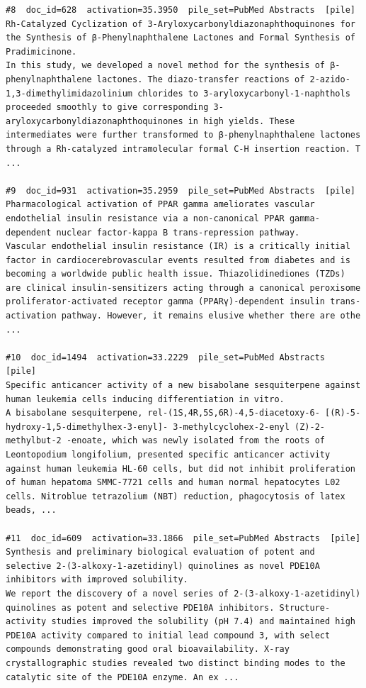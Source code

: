 \begin{verbatim}
#8  doc_id=628  activation=35.3950  pile_set=PubMed Abstracts  [pile]
Rh-Catalyzed Cyclization of 3-Aryloxycarbonyldiazonaphthoquinones for the Synthesis of β-Phenylnaphthalene Lactones and Formal Synthesis of Pradimicinone.
In this study, we developed a novel method for the synthesis of β-phenylnaphthalene lactones. The diazo-transfer reactions of 2-azido-1,3-dimethylimidazolinium chlorides to 3-aryloxycarbonyl-1-naphthols proceeded smoothly to give corresponding 3-aryloxycarbonyldiazonaphthoquinones in high yields. These intermediates were further transformed to β-phenylnaphthalene lactones through a Rh-catalyzed intramolecular formal C-H insertion reaction. T ...

#9  doc_id=931  activation=35.2959  pile_set=PubMed Abstracts  [pile]
Pharmacological activation of PPAR gamma ameliorates vascular endothelial insulin resistance via a non-canonical PPAR gamma-dependent nuclear factor-kappa B trans-repression pathway.
Vascular endothelial insulin resistance (IR) is a critically initial factor in cardiocerebrovascular events resulted from diabetes and is becoming a worldwide public health issue. Thiazolidinediones (TZDs) are clinical insulin-sensitizers acting through a canonical peroxisome proliferator-activated receptor gamma (PPARγ)-dependent insulin trans-activation pathway. However, it remains elusive whether there are othe ...

#10  doc_id=1494  activation=33.2229  pile_set=PubMed Abstracts  [pile]
Specific anticancer activity of a new bisabolane sesquiterpene against human leukemia cells inducing differentiation in vitro.
A bisabolane sesquiterpene, rel-(1S,4R,5S,6R)-4,5-diacetoxy-6- [(R)-5-hydroxy-1,5-dimethylhex-3-enyl]- 3-methylcyclohex-2-enyl (Z)-2-methylbut-2 -enoate, which was newly isolated from the roots of Leontopodium longifolium, presented specific anticancer activity against human leukemia HL-60 cells, but did not inhibit proliferation of human hepatoma SMMC-7721 cells and human normal hepatocytes L02 cells. Nitroblue tetrazolium (NBT) reduction, phagocytosis of latex beads, ...

#11  doc_id=609  activation=33.1866  pile_set=PubMed Abstracts  [pile]
Synthesis and preliminary biological evaluation of potent and selective 2-(3-alkoxy-1-azetidinyl) quinolines as novel PDE10A inhibitors with improved solubility.
We report the discovery of a novel series of 2-(3-alkoxy-1-azetidinyl) quinolines as potent and selective PDE10A inhibitors. Structure-activity studies improved the solubility (pH 7.4) and maintained high PDE10A activity compared to initial lead compound 3, with select compounds demonstrating good oral bioavailability. X-ray crystallographic studies revealed two distinct binding modes to the catalytic site of the PDE10A enzyme. An ex ...


\end{verbatim}
